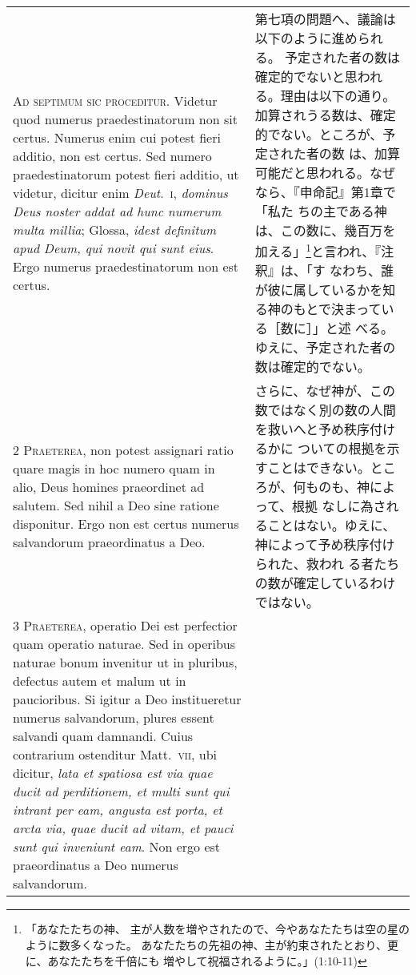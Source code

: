 \documentclass[10pt]{jsarticle} %
\begin{document}
\begin{longtable}{p{21em}p{21em}}


{\Huge A}{\scshape d septimum sic proceditur}. Videtur quod
numerus praedestinatorum non sit certus. Numerus enim cui potest fieri
additio, non est certus. Sed numero praedestinatorum potest fieri
additio, ut videtur, dicitur enim {\itshape Deut}.~{\scshape i}, {\itshape dominus Deus noster addat ad
hunc numerum multa millia}; Glossa, {\itshape idest definitum apud Deum, qui novit
qui sunt eius}. Ergo numerus praedestinatorum non est certus.


&

第七項の問題へ、議論は以下のように進められる。
予定された者の数は確定的でないと思われる。理由は以下の通り。
加算されうる数は、確定的でない。ところが、予定された者の数
 は、加算可能だと思われる。なぜなら、『申命記』第1章で「私た
 ちの主である神は、この数に、幾百万を加える」\footnote{「あなたたちの神、
 主が人数を増やされたので、今やあなたたちは空の星のように数多くなった。
 あなたたちの先祖の神、主が約束されたとおり、更に、あなたたちを千倍にも
 増やして祝福されるように。」(1:10-11)}と言われ、『注釈』は、「す
 なわち、誰が彼に属しているかを知る神のもとで決まっている［数に］」と述
 べる。ゆえに、予定された者の数は確定的でない。


\\


{\scshape 2 Praeterea}, non potest assignari ratio quare
magis in hoc numero quam in alio, Deus homines praeordinet ad
salutem. Sed nihil a Deo sine ratione disponitur. Ergo non est certus
numerus salvandorum praeordinatus a Deo.


&


さらに、なぜ神が、この数ではなく別の数の人間を救いへと予め秩序付けるかに
 ついての根拠を示すことはできない。ところが、何ものも、神によって、根拠
 なしに為されることはない。ゆえに、神によって予め秩序付けられた、救われ
 る者たちの数が確定しているわけではない。

\\


{\scshape 3 Praeterea}, operatio Dei est perfectior quam
operatio naturae. Sed in operibus naturae bonum invenitur ut in
pluribus, defectus autem et malum ut in paucioribus. Si igitur a Deo
institueretur numerus salvandorum, plures essent salvandi quam
damnandi. Cuius contrarium ostenditur Matt.~{\scshape vii}, ubi dicitur, {\itshape lata et
spatiosa est via quae ducit ad perditionem, et multi sunt qui intrant
per eam, angusta est porta, et arcta via, quae ducit ad vitam, et pauci
sunt qui inveniunt eam}. Non ergo est praeordinatus a Deo numerus
salvandorum.



\end{longtable}
\end{document}
